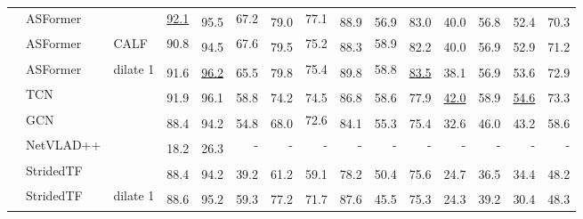 \documentclass[runningheads]{llncs}
\newcommand{\best}[1]{\underline{#1}}
\newcommand{\nms}{\textsuperscript{\textdagger}}
\begin{document}
\begin{table*}[p]
{\begin{tabularx}{\textwidth}{lll
        rr
        rr
        rr
        rr
        rr
        rr
    }
        \cmidrule{2-15}
        & ASFormer &
            & \best{92.1} & \nms 95.5 & 67.2 & \nms 79.0 & 77.1 & \nms 88.9 & \nms 56.9 & \nms 83.0 & \nms 40.0 & \nms 56.8 & \nms 52.4 & \nms 70.3 \\
        & ASFormer & CALF
            & 90.8 & \nms 94.5 & 67.6 & \nms 79.5 & 75.2 & \nms 88.3 & 58.9 & \nms 82.2 & \nms 40.0 & \nms 56.9 & \nms 52.9 & \nms 71.2 \\
        & ASFormer & dilate 1
            & \nms 91.6 & \nms \best{96.2} & \nms 65.5 & \nms 79.8 & 75.4 & \nms 89.8 & 58.8 & \nms \best{83.5} & \nms 38.1 & \nms 56.9 & \nms 53.6 & \nms 72.9 \\

        \cmidrule{2-15}
        & TCN &
            & \nms 91.9 & \nms 96.1 & \nms 58.8 & \nms 74.2 & \nms 74.5 & \nms 86.8 & \nms 58.6 & \nms 77.9 & \nms \best{42.0} & \nms 58.9 & \nms \best{54.6} & \nms 73.3 \\

        & GCN &
            & \nms 88.4 & \nms 94.2 & \nms 54.8 & \nms 68.0 & 72.6 & \nms 84.1 & \nms 55.3 & \nms 75.4 & \nms 32.6 & \nms 46.0 & \nms 43.2 & \nms 58.6 \\

        & NetVLAD++ &
            & \nms 18.2 & \nms 26.3 & - & - & - & - & - & - & - & -  & - & - \\

        \cmidrule{2-15}
        & StridedTF &
            & \nms 88.4 & \nms 94.2 & \nms 39.2 & \nms 61.2 & \nms 59.1 & \nms 78.2 & \nms 50.4 & \nms 75.6 & \nms 24.7 & \nms 36.5 & \nms 34.4 & \nms 48.2 \\

        & StridedTF & dilate 1
            & \nms 88.6 & \nms 95.2 & \nms 59.3 & \nms 77.2 & \nms 71.7 & \nms 87.6 & \nms 45.5 & \nms 75.3 & \nms 24.3 & \nms 39.2 & \nms 30.4 & \nms 48.3 \\

        \bottomrule
    \end{tabularx}
    }
\end{table*}
\end{document}
